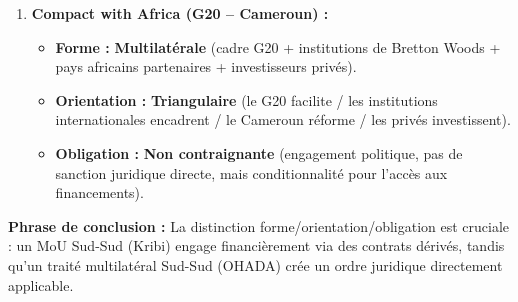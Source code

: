 \documentclass[11pt]{article}
\begin{document}
\begin{exoresolu}
\begin{enumerate}
\begin{itemize}
        \item \textbf{Forme :} \textbf{Bilatérale} (Gouvernement camerounais $\leftrightarrow$ Gouvernement chinois / Exim Bank of China / entreprises chinoises).
        \item \textbf{Orientation :} \textbf{Sud-Sud} (Chine = pays émergent, Cameroun = pays en développement).
        \item \textbf{Obligation :} \textbf{Non contraignante (politique/morale)} pour le MoU lui-même. \textbf{Attention :} les contrats commerciaux (EPC : Engineering, Procurement, Construction) et accords de prêt qui en découlent sont, eux, \textbf{contraignants}.
    \end{itemize}
    \item \textbf{Compact with Africa (G20 -- Cameroun) :}
    \begin{itemize}
        \item \textbf{Forme :} \textbf{Multilatérale} (cadre G20 + institutions de Bretton Woods + pays africains partenaires + investisseurs privés).
        \item \textbf{Orientation :} \textbf{Triangulaire} (le G20 facilite / les institutions internationales encadrent / le Cameroun réforme / les privés investissent).
        \item \textbf{Obligation :} \textbf{Non contraignante} (engagement politique, pas de sanction juridique directe, mais conditionnalité pour l'accès aux financements).
    \end{itemize}
\end{enumerate}
\textbf{Phrase de conclusion :} La distinction forme/orientation/obligation est cruciale : un MoU Sud-Sud (Kribi) engage financièrement via des contrats dérivés, tandis qu'un traité multilatéral Sud-Sud (OHADA) crée un ordre juridique directement applicable.
\end{exoresolu}
\end{document}

